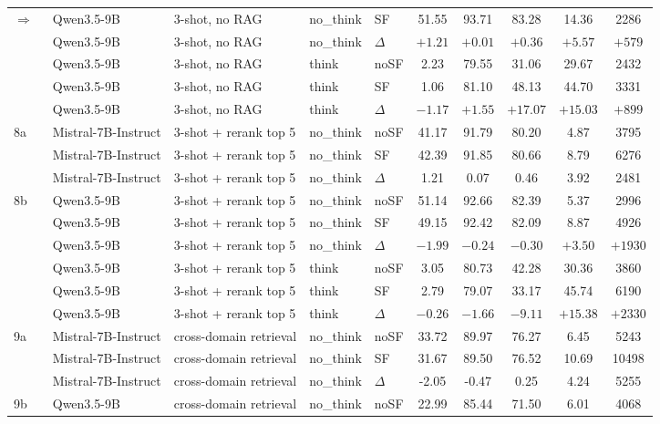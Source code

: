 \begin{scriptsize}
\begin{longtable}{l l l l l c c c c c}
\rowcolor{tabhighlight}$\Rightarrow$~ & Qwen3.5-9B & 3-shot, no RAG & no\_think & SF & 51.55 & 93.71 & 83.28 & 14.36 & 2286 \\
 & Qwen3.5-9B & 3-shot, no RAG & no\_think & $\Delta$ & $+1.21$ & $+0.01$ & $+0.36$ & $+5.57$ & $+579$ \\
 & Qwen3.5-9B & 3-shot, no RAG & think & noSF & 2.23 & 79.55 & 31.06 & 29.67 & 2432 \\
 & Qwen3.5-9B & 3-shot, no RAG & think & SF & 1.06 & 81.10 & 48.13 & 44.70 & 3331 \\
 & Qwen3.5-9B & 3-shot, no RAG & think & $\Delta$ & $-1.17$ & $+1.55$ & $+17.07$ & $+15.03$ & $+899$ \\
\dmidrule
8a & Mistral-7B-Instruct & 3-shot + rerank top 5 & no\_think & noSF & 41.17 & 91.79 & 80.20 & 4.87 & 3795 \\
\rowcolor{tabhighlight} & Mistral-7B-Instruct & 3-shot + rerank top 5 & no\_think & SF & 42.39 & 91.85 & 80.66 & 8.79 & 6276 \\
 & Mistral-7B-Instruct & 3-shot + rerank top 5 & no\_think & $\Delta$ & 1.21 & 0.07 & 0.46 & 3.92 & 2481 \\
8b & Qwen3.5-9B & 3-shot + rerank top 5 & no\_think & noSF & 51.14 & 92.66 & 82.39 & 5.37 & 2996 \\
 & Qwen3.5-9B & 3-shot + rerank top 5 & no\_think & SF & 49.15 & 92.42 & 82.09 & 8.87 & 4926 \\
 & Qwen3.5-9B & 3-shot + rerank top 5 & no\_think & $\Delta$ & $-1.99$ & $-0.24$ & $-0.30$ & $+3.50$ & $+1930$ \\
 & Qwen3.5-9B & 3-shot + rerank top 5 & think & noSF & 3.05 & 80.73 & 42.28 & 30.36 & 3860 \\
 & Qwen3.5-9B & 3-shot + rerank top 5 & think & SF & 2.79 & 79.07 & 33.17 & 45.74 & 6190 \\
 & Qwen3.5-9B & 3-shot + rerank top 5 & think & $\Delta$ & $-0.26$ & $-1.66$ & $-9.11$ & $+15.38$ & $+2330$ \\
\dmidrule
9a & Mistral-7B-Instruct & cross-domain retrieval & no\_think & noSF & 33.72 & 89.97 & 76.27 & 6.45 & 5243 \\
 & Mistral-7B-Instruct & cross-domain retrieval & no\_think & SF & 31.67 & 89.50 & 76.52 & 10.69 & 10498 \\
 & Mistral-7B-Instruct & cross-domain retrieval & no\_think & $\Delta$ & -2.05 & -0.47 & 0.25 & 4.24 & 5255 \\
9b & Qwen3.5-9B & cross-domain retrieval & no\_think & noSF & 22.99 & 85.44 & 71.50 & 6.01 & 4068 \\

\end{longtable}
\end{scriptsize}
